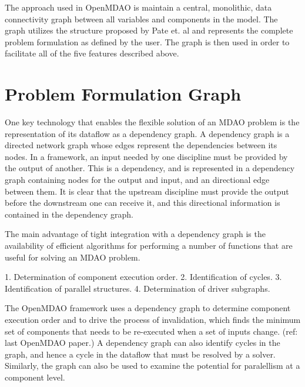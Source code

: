 \documentclass[]{aiaa-tc} %
\begin{document}
    The approach used in OpenMDAO is maintain a central, monolithic, data connectivity graph between all 
    variables and components in the model. The graph utilizes the structure proposed by Pate et. al \cite{graph_problem2013} 
    and represents the complete problem formulation as defined by the user. The graph is then used in order to 
    facilitate all of the five features described above. 

  \section{Problem Formulation Graph}

    One key technology that enables the flexible solution of an MDAO problem is the representation
    of its dataflow as a dependency graph. A dependency graph is a directed network graph whose
    edges represent the dependencies between its nodes. In a framework, an input needed by one
    discipline must be provided by the output of another. This is a dependency, and is represented 
    in a dependency graph containing nodes for the output and input, and an directional edge
    between them. It is clear that the upstream discipline must provide the output before the 
    downstream one can receive it, and this directional information is contained in the dependency
    graph.

    The main advantage of tight integration with a dependency graph is the availability of efficient
    algorithms for performing a number of functions that are useful for solving an MDAO problem.

      1. Determination of component execution order.
      2. Identification of cycles.
      3. Identification of parallel structures.
      4. Determination of driver subgraphs.
      
    The OpenMDAO framework uses a dependency graph to determine component execution order and to
    drive the process of invalidation, which finds the minimum set of components that needs to
    be re-executed when a set of inputs change. (ref: last OpenMDAO paper.) A dependency graph
    can also identify cycles in the graph, and hence a cycle in the dataflow that must be resolved
    by a solver. Similarly, the graph can also be used to examine the potential for paralellism at
    a component level.
\end{document}
